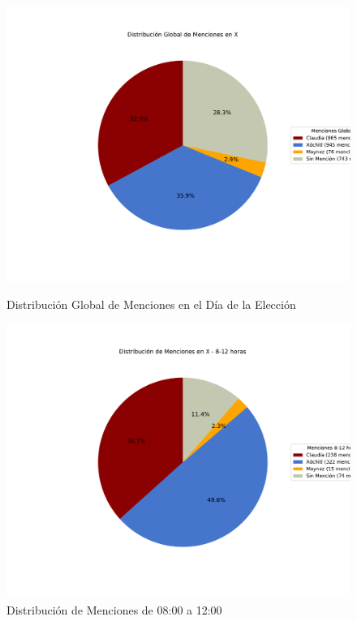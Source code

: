 \documentclass[10pt, a4paper]{article}
\begin{document}
	\begin{figure}[h!]
		\centering
		\begin{minipage}{0.49\textwidth} %
			\includegraphics[width=\linewidth]{grafica_global_x.pdf} 
			\vspace{-15mm}
			\caption{Distribución Global de Menciones en el Día de la Elección}
			\label{fig:globalDiaEleccion}
		\end{minipage}
		\hfill %
		\begin{minipage}{0.49\textwidth}
			\includegraphics[width=\linewidth]{grafica_intervalo_8-12.pdf}
			\vspace{-15mm}
			\caption{Distribución de Menciones de 08:00 a 12:00}
			\label{fig:xIntervalo812}
		\end{minipage}
	\end{figure}
	
\end{document}
